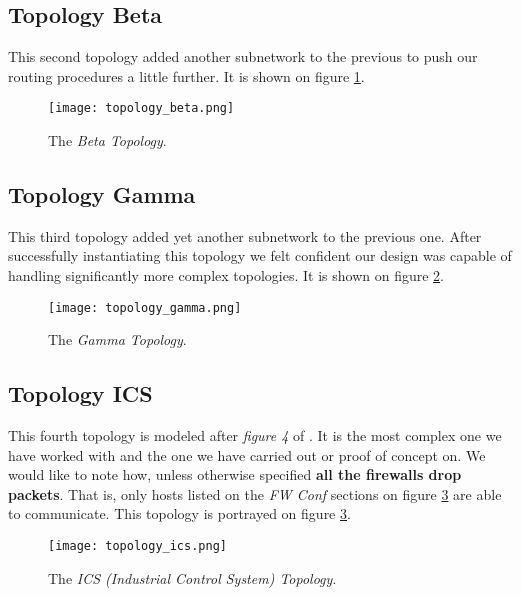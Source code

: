         \subsection{Topology Beta}
            This second topology added another subnetwork to the previous to push our routing procedures a little further. It is shown on figure \ref{fig:top-beta}.\\

            \begin{figure}
                \centering
                \texttt{[image: topology\_beta.png]}
                \caption{The \textit{Beta Topology}.}
                \label{fig:top-beta}
            \end{figure}

        \subsection{Topology Gamma}
            This third topology added yet another subnetwork to the previous one. After successfully instantiating this topology we felt confident our design was capable of handling significantly more complex topologies. It is shown on figure \ref{fig:top-gamma}.\\

            \begin{figure}
                \centering
                \texttt{[image: topology\_gamma.png]}
                \caption{The \textit{Gamma Topology}.}
                \label{fig:top-gamma}
            \end{figure}

        \subsection{Topology ICS}
            This fourth topology is modeled after \textit{figure 4} of \cite{bib:ics-article}. It is the most complex one we have worked with and the one we have carried out or proof of concept on. We would like to note how, unless otherwise specified \textbf{all the firewalls drop packets}. That is, only hosts listed on the \textit{FW Conf} sections on figure \ref{fig:top-ics} are able to communicate. This topology is portrayed on figure \ref{fig:top-ics}.\\

            \begin{figure}
                \centering
                \texttt{[image: topology\_ics.png]}
                \caption{The \textit{ICS (Industrial Control System) Topology}.}
                \label{fig:top-ics}
            \end{figure}
